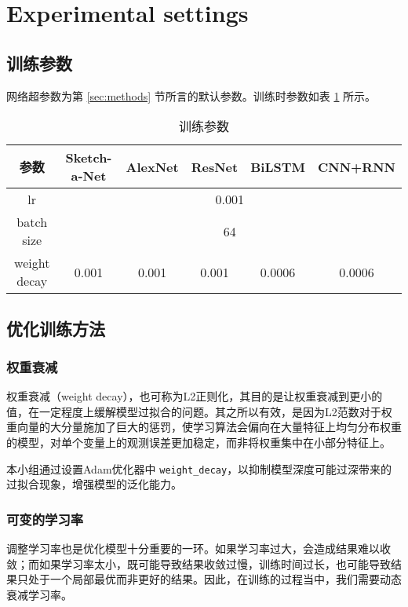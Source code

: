\section{Experimental settings}

\subsection{训练参数}

网络超参数为第 \ref{sec:methods} 节所言的默认参数。训练时参数如表 \ref{tab:param} 所示。

\begin{table}[ht]
    \centering
    \caption{训练参数}
    \label{tab:param}
    \begin{tabular}{cccccc}
        \toprule
        参数 & Sketch-a-Net &  AlexNet & ResNet & BiLSTM & CNN+RNN \\
        \midrule
        lr &  \multicolumn{5}{c}{0.001} \\
        batch size & \multicolumn{5}{c}{64}  \\
        weight decay & 0.001 &  0.001&  0.001& 0.0006  &0.0006 \\
        \bottomrule
    \end{tabular}
\end{table}

\subsection{优化训练方法}

\subsubsection{权重衰减}
    权重衰减（weight decay），也可称为L2正则化，其目的是让权重衰减到更小的值，在一定程度上缓解模型过拟合的问题。其之所以有效，是因为L2范数对于权重向量的大分量施加了巨大的惩罚，使学习算法会偏向在大量特征上均匀分布权重的模型，对单个变量上的观测误差更加稳定，而非将权重集中在小部分特征上。
    
    本小组通过设置Adam优化器中 \verb"weight_decay"，以抑制模型深度可能过深带来的过拟合现象，增强模型的泛化能力。
\subsubsection{可变的学习率}
    调整学习率也是优化模型十分重要的一环。如果学习率过大，会造成结果难以收敛；而如果学习率太小，既可能导致结果收敛过慢，训练时间过长，也可能导致结果只处于一个局部最优而非更好的结果。因此，在训练的过程当中，我们需要动态衰减学习率。
    

